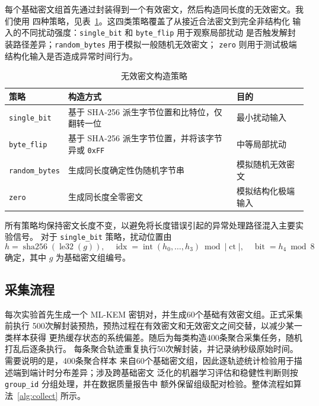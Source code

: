 \documentclass[a4paper,fontset=none]{ctexart}
\begin{document}
每个基础密文组首先通过封装得到一个有效密文，然后构造同长度的无效密文。我们使用
四种策略，见表~\ref{tab:strategies}。这四类策略覆盖了从接近合法密文到完全非结构化
输入的不同扰动强度：\texttt{single\_bit} 和 \texttt{byte\_flip} 用于观察局部扰动
是否触发解封装路径差异；\texttt{random\_bytes} 用于模拟一般随机无效密文；
\texttt{zero} 则用于测试极端结构化输入是否造成异常时间行为。

\begin{table}[H]
  \centering
  \setlength{\tabcolsep}{4pt}
  \caption{无效密文构造策略}
  \label{tab:strategies}
  \begin{tabular}{>{\raggedright\arraybackslash}p{}
                  >{\raggedright\arraybackslash}p{}
                  >{\raggedright\arraybackslash}p{}}
    \toprule
    策略 & 构造方式 & 目的 \\
    \midrule
    \texttt{single\_bit} & 基于 SHA-256 派生字节位置和比特位，仅翻转一位
      & 最小扰动输入 \\
    \texttt{byte\_flip} & 基于 SHA-256 派生字节位置，并将该字节异或 \texttt{0xFF}
      & 中等局部扰动 \\
    \texttt{random\_bytes} & 生成同长度确定性伪随机字节串
      & 模拟随机无效密文 \\
    \texttt{zero} & 生成同长度全零密文
      & 模拟结构化极端输入 \\
    \bottomrule
  \end{tabular}
\end{table}

所有策略均保持密文长度不变，以避免将长度错误引起的异常处理路径混入主要实验信号。
对于 \texttt{single\_bit} 策略，扰动位置由
\begin{equation}
  h=\operatorname{sha256}(\operatorname{le32}(g)),\quad
  \operatorname{idx}=\operatorname{int}(h_0,\ldots,h_3)\bmod |\operatorname{ct}|,\quad
  \operatorname{bit}=h_4\bmod 8
\end{equation}
确定，其中 $g$ 为基础密文组编号。

\subsection{采集流程}

每次实验首先生成一个 ML-KEM 密钥对，并生成60个基础有效密文组。正式采集前执行
500次解封装预热，预热过程在有效密文和无效密文之间交替，以减少某一类样本获得
更热缓存状态的系统偏差。随后为每类构造400条聚合采集任务，随机打乱后逐条执行。
每条聚合轨迹重复执行50次解封装，并记录纳秒级原始时间。需要说明的是，400条聚合样本
来自60个基础密文组，因此逐轨迹统计检验用于描述端到端计时分布差异；涉及跨基础密文
泛化的机器学习评估和稳健性判断则按 \texttt{group\_id} 分组处理，并在数据质量报告中
额外保留组级配对检验。整体流程如算法~\ref{alg:collect} 所示。
\end{document}
